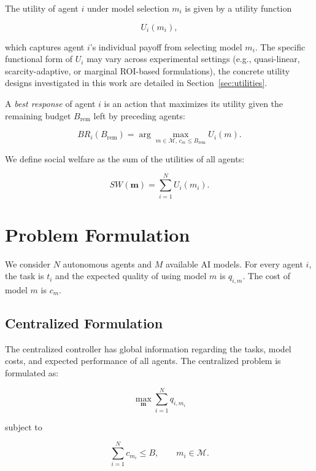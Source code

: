 \documentclass{article}
\begin{document}
The utility of agent $i$ under model selection $m_i$ is given by a utility function 

\begin{equation} 
U_i(m_i), 
\end{equation} 

which captures agent $i$'s individual payoff from selecting model $m_i$. The specific functional form of $U_i$ may vary across experimental settings (e.g., quasi-linear, scarcity-adaptive, or marginal ROI-based formulations), the concrete utility designs investigated in this work are detailed in Section~\ref{sec:utilities}.

A \textit{best response} of agent $i$ is an action that maximizes its utility given the remaining budget $B_{\mathrm{rem}}$ left by preceding agents: 

\begin{equation} 
BR_i(B_{\mathrm{rem}}) = \arg\max_{m \in \mathcal{M}, \, c_m \leq B_{\mathrm{rem}}} U_i(m). 
\end{equation} 

We define social welfare as the sum of the utilities of all agents: 

\begin{equation} 
SW(\mathbf{m}) = \sum_{i=1}^{N}U_i(m_i). 
\end{equation}

\section{Problem Formulation} 

We consider $N$ autonomous agents and $M$ available AI models. For every agent $i$, the task is $t_i$ and the expected quality of using model $m$ is $q_{i,m}$. The cost of model $m$ is $c_m$. 

\subsection{Centralized Formulation}

The centralized controller has global information regarding the tasks, model costs, and expected performance of all agents. The centralized problem is formulated as:

\begin{equation} 
\max_{\mathbf{m}} \sum_{i=1}^{N} q_{i,m_i} 
\end{equation} 

subject to 

\begin{equation} 
\sum_{i=1}^{N} c_{m_i}\leq B, \qquad m_i\in\mathcal{M}. 
\end{equation} 
\end{document}
